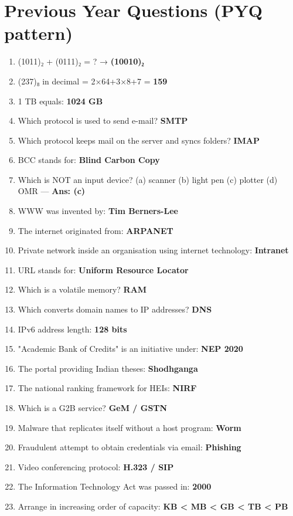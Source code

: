 \needspace{95pt}

\hypertarget{p1-08--previous-year-questions-pyq-pattern}{%
\section{Previous Year Questions (PYQ pattern)}\label{p1-08--previous-year-questions-pyq-pattern}}

\begin{enumerate}
\def\labelenumi{\arabic{enumi}.}
\tightlist
\item
  (1011)₂ + (0111)₂ = ? → \textbf{(10010)₂}
\item
  (237)₈ in decimal = 2×64+3×8+7 = \textbf{159}
\item
  1 TB equals: \textbf{1024 GB}
\item
  Which protocol is used to send e-mail? \textbf{SMTP}
\item
  Which protocol keeps mail on the server and syncs folders? \textbf{IMAP}
\item
  BCC stands for: \textbf{Blind Carbon Copy}
\item
  Which is NOT an input device? (a) scanner (b) light pen (c) plotter (d) OMR --- \textbf{Ans: (c)}
\item
  WWW was invented by: \textbf{Tim Berners-Lee}
\item
  The internet originated from: \textbf{ARPANET}
\item
  Private network inside an organisation using internet technology: \textbf{Intranet}
\item
  URL stands for: \textbf{Uniform Resource Locator}
\item
  Which is a volatile memory? \textbf{RAM}
\item
  Which converts domain names to IP addresses? \textbf{DNS}
\item
  IPv6 address length: \textbf{128 bits}
\item
  "Academic Bank of Credits" is an initiative under: \textbf{NEP 2020}
\item
  The portal providing Indian theses: \textbf{Shodhganga}
\item
  The national ranking framework for HEIs: \textbf{NIRF}
\item
  Which is a G2B service? \textbf{GeM / GSTN}
\item
  Malware that replicates itself without a host program: \textbf{Worm}
\item
  Fraudulent attempt to obtain credentials via email: \textbf{Phishing}
\item
  Video conferencing protocol: \textbf{H.323 / SIP}
\item
  The Information Technology Act was passed in: \textbf{2000}
\item
  Arrange in increasing order of capacity: \textbf{KB \textless{} MB \textless{} GB \textless{} TB \textless{} PB}
\end{enumerate}

